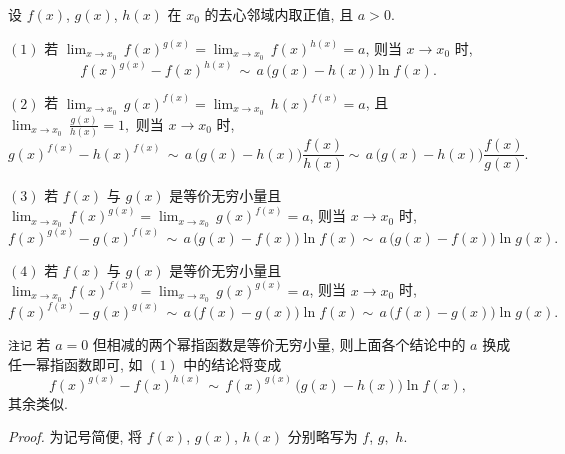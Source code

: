 


\begin{theorem}{}
设 $f(x)$, $g(x)$, $h(x)$ 在 $x_{0}$ 的去心邻域内取正值,
且 $a>0$. 

$(1)$ 若 ${\displaystyle \lim_{x\to x_{0}}}\,f(x)^{g(x)}={\displaystyle \lim_{x\to x_{0}}}\,f(x)^{h(x)}=a$,
则当 $x\to x_{0}$ 时, 
$$
f(x)^{g(x)}-f(x)^{h(x)}\,\sim\,a\,\big(g(x)-h(x)\big)\ln f(x).~
$$
 

$(2)$ 若 ${\displaystyle {\displaystyle \lim_{x\to x_{0}}}\,}g(x)^{f(x)}={\displaystyle \lim_{x\to x_{0}}}\,h(x)^{f(x)}=a$,
且 ${\displaystyle \lim_{x\to x_{0}}}\,{\displaystyle \frac{g(x)}{h(x)}}=1,$
则当 $x\to x_{0}$ 时, 
\[
g(x)^{f(x)}-h(x)^{f(x)}\,\sim\,a\,\big(g(x)-h(x)\big)\frac{f(x)}{h(x)}\sim\,a\,\big(g(x)-h(x)\big)\frac{f(x)}{g(x)}.~
\]

$(3)$ 若 $f(x)$ 与 $g(x)$ 是等价无穷小量且 ${\displaystyle {\displaystyle \lim_{x\to x_{0}}}\,}f(x)^{g(x)}={\displaystyle \lim_{x\to x_{0}}}\,g(x)^{f(x)}=a$,
则当 $x\to x_{0}$ 时, 
\[
f(x)^{g(x)}-g(x)^{f(x)}\,\sim\,a\,\big(g(x)-f(x)\big)\ln f(x)\sim\,a\,\big(g(x)-f(x)\big)\ln g(x).~
\]

$(4)$ 若 $f(x)$ 与 $g(x)$ 是等价无穷小量且 ${\displaystyle {\displaystyle \lim_{x\to x_{0}}}\,}f(x)^{f(x)}={\displaystyle \lim_{x\to x_{0}}}\,g(x)^{g(x)}=a$,
则当 $x\to x_{0}$ 时, 
\[
f(x)^{f(x)}-g(x)^{g(x)}\,\sim\,a\,\big(f(x)-g(x)\big)\ln f(x)\sim\,a\,\big(f(x)-g(x)\big)\ln g(x).~
\]

\verb`注记`
若 $a=0$ 但相减的两个幂指函数是等价无穷小量, 则上面各个结论中的 $a$ 换成任一幂指函数即可, 如 $(1)$ 中的结论将变成
\[
f(x)^{g(x)}-f(x)^{h(x)}\,\sim\,f(x)^{g(x)}\,\big(g(x)-h(x)\big)\ln f(x),~
\]
其余类似. 

\end{theorem}


\textsl{Proof.} 为记号简便, 将 $f(x)$, $g(x)$, $h(x)$ 分别略写为 $f$, $g,$ $h$. 

